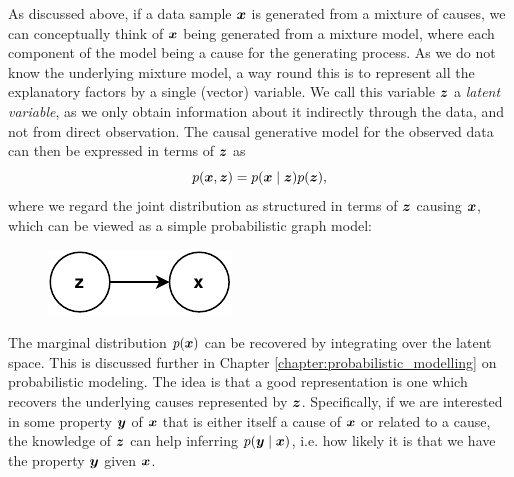 As discussed above, if a data sample $\bm{ x }$ is generated from a mixture of causes, we can conceptually think of $\bm{ x }$ being generated from a mixture model, where each component of the model being a cause for the generating process. As we do not know the underlying mixture model, a way round this is to represent all the explanatory factors by a single (vector) variable. We call this variable $\bm{ z }$ a \textit{latent variable}, as we only obtain information about it indirectly through the data, and not from direct observation. The causal generative model for the observed data can then be expressed in terms of $\bm{ z }$ as
\[ p(\bm{ x }, \bm{ z }) = p(\bm{ x } \mid \bm{ z }) p(\bm{ z }), \]
where we regard the joint distribution as structured in terms of $\bm{ z }$ causing $\bm{ x }$, which can be viewed as a simple probabilistic graph model:
\begin{figure}[H]
    \centering
    \includegraphics{report/figures/probabilistic_model.pdf}
    \label{fig:probabilistic_model_graph}
\end{figure}
The marginal distribution $p(\bm{ x })$ can be recovered by integrating over the latent space. This is discussed further in Chapter \ref{chapter:probabilistic_modelling} on probabilistic modeling. The idea is that a good representation is one which recovers the underlying causes represented by $\bm{ z }$. Specifically, if we are interested in some property $\bm{ y }$ of $\bm{ x }$ that is either itself a cause of $\bm{ x }$ or related to a cause, the knowledge of $\bm{ z }$ can help inferring $p(\bm{ y } \mid \bm{ x })$, i.e. how likely it is that we have the property $\bm{ y }$ given $\bm{ x }$.


